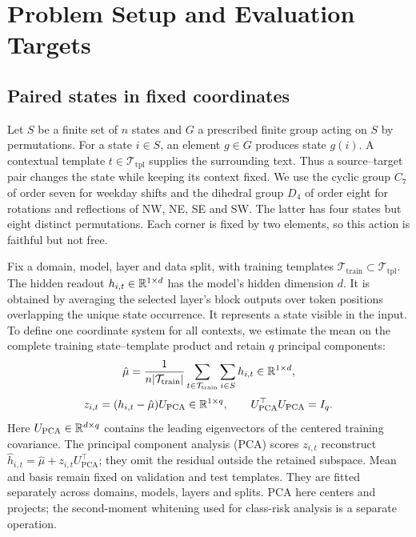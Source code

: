 \section{Problem Setup and Evaluation Targets}
\label{sec:setup}
\subsection{Paired states in fixed coordinates}
Let $S$ be a finite set of $n$ states and $G$ a prescribed finite group acting on $S$ by permutations. For a state $i\in S$, an element $g\in G$ produces state $g(i)$. A contextual template $t\in\mathcal T_{\mathrm{tpl}}$ supplies the surrounding text. Thus a source--target pair changes the state while keeping its context fixed. We use the cyclic group $C_7$ of order seven for weekday shifts and the dihedral group $D_4$ of order eight for rotations and reflections of NW, NE, SE and SW. The latter has four states but eight distinct permutations. Each corner is fixed by two elements, so this action is faithful but not free.

Fix a domain, model, layer and data split, with training templates $\mathcal T_{\mathrm{train}}\subset\mathcal T_{\mathrm{tpl}}$. The hidden readout $h_{i,t}\in\mathbb{R}^{1\times d}$ has the model's hidden dimension $d$. It is obtained by averaging the selected layer's block outputs over token positions overlapping the unique state occurrence. It represents a state visible in the input. To define one coordinate system for all contexts, we estimate the mean on the complete training state--template product and retain $q$ principal components:
\[
 \hat\mu=\frac{1}{n|\mathcal T_{\mathrm{train}}|}
 \sum_{t\in\mathcal T_{\mathrm{train}}}\sum_{i\in S}h_{i,t}
 \in\mathbb{R}^{1\times d},
\]
\begin{equation}
 z_{i,t}=(h_{i,t}-\hat\mu)U_{\mathrm{PCA}}\in\mathbb{R}^{1\times q},
 \qquad U_{\mathrm{PCA}}^\top U_{\mathrm{PCA}}=I_q.
 \label{eq:projection}
\end{equation}
Here $U_{\mathrm{PCA}}\in\mathbb{R}^{d\times q}$ contains the leading eigenvectors of the centered training covariance. The principal component analysis (PCA) scores $z_{i,t}$ reconstruct $\hat h_{i,t}=\hat\mu+z_{i,t}U_{\mathrm{PCA}}^\top$; they omit the residual outside the retained subspace. Mean and basis remain fixed on validation and test templates. They are fitted separately across domains, models, layers and splits. PCA here centers and projects; the second-moment whitening used for class-risk analysis is a separate operation.

